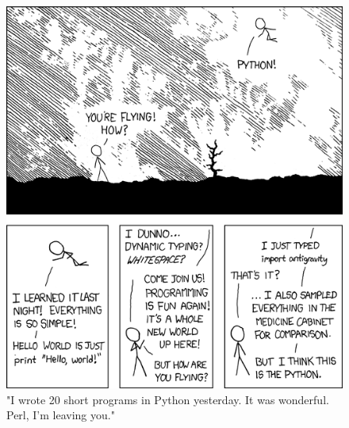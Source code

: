 \documentclass[letterpaper,12pt]{article}
\begin{document}
\begin{figure}[ht!]
\centering
\includegraphics[width=6in]{python.png}
\caption*{"I wrote 20 short programs in Python yesterday.  It was wonderful.  Perl, I'm leaving you."}
\end{figure}
\end{document}
